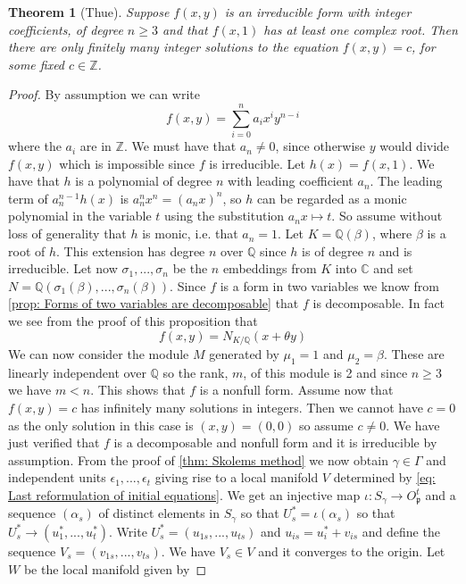 \documentclass{article}
\newtheorem{theorem}{Theorem}[section]
\newcommand{\mfrak}[1]{\mathfrak{#1}}
\newcommand{\mbb}[1]{\mathbb{#1}}
\begin{document}
\begin{theorem}[Thue]\label{thm: Thues theorem}
    Suppose $f(x,y)$ is an irreducible form with integer coefficients, of degree $n \geq 3$ and that $f(x,1)$ has at least one complex root. Then there are only finitely many integer solutions to the equation $f(x,y) = c$, for some fixed $c \in \mbb{Z}$.
\end{theorem}
\begin{proof}
    By assumption we can write 
    $$f(x,y) = \sum_{i = 0}^n a_i x^{i} y^{n-i}$$
    where the $a_i$ are in $\mbb Z$. We must have that $a_n \neq 0$, since otherwise $y$ would divide $f(x,y)$ which is impossible since $f$ is irreducible. Let $h(x) = f(x,1)$. We have that $h$ is a polynomial of degree $n$ with leading coefficient $a_n$. The leading term of $a_n^{n-1} h(x)$ is $a_n^nx^n = (a_n x)^n$, so $h$ can be regarded as a monic polynomial in the variable $t$ using the substitution $a_n x \mapsto t$. So assume without loss of generality that $h$ is monic, i.e. that $a_n = 1$. Let $K = \mbb Q(\beta)$, where $\beta$ is a root of $h$. This extension has degree $n$ over $\mbb Q$ since $h$ is of degree $n$ and is irreducible. Let now $\sigma_1, ..., \sigma_n$ be the $n$ embeddings from $K$ into $\mbb C$ and set $N = \mbb Q(\sigma_1(\beta), ..., \sigma_n(\beta))$. Since $f$ is a form in two variables we know from \cref{prop: Forms of two variables are decomposable} that $f$ is decomposable. In fact we see from the proof of this proposition that
    $$f(x, y) = N_{K / \mbb Q}(x + \theta y)$$
    We can now consider the module $M$ generated by $\mu_1 = 1$ and $\mu_2 = \beta$. These are linearly independent over $\mbb Q$ so the rank, $m$, of this module is 2 and since $n \geq 3$ we have $m < n$. This shows that $f$ is a nonfull form. Assume now that $f(x,y) = c$ has infinitely many solutions in integers. Then we cannot have $c = 0$ as the only solution in this case is $(x,y) = (0,0)$ so assume $c \neq 0$. We have just verified that $f$ is a decomposable and nonfull form and it is irreducible by assumption. From the proof of \cref{thm: Skolems method} we now obtain $\gamma \in \Gamma$ and independent units $\epsilon_1, ..., \epsilon_t$ giving rise to a local manifold $V$ determined by \cref{eq: Last reformulation of initial equations}. We get an injective map $\iota : S_\gamma \to O_\mfrak p^t$ and a sequence $(\alpha_s)$ of distinct elements in $S_\gamma$ so that $U^*_s = \iota(\alpha_s)$ so that $U^*_s \to (u_1^*, ..., u_t^*)$. Write $U^*_s = (u_{1s}, ..., u_{ts})$ and $u_{is} = u_i^* + v_{is}$ and define the sequence $V_s = (v_{1s}, ..., v_{ts})$. We have $V_s \in V$ and it converges to the origin. Let $W$ be the local manifold given by 

\end{proof}
\end{document}
